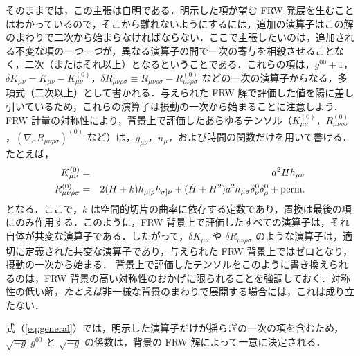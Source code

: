 そのままでは，この主張は自明である．明示した項が望む FRW 発展を生むことはわかっているので，そこから離れないようにするには，追加の演算子はこの解のまわりで二次から始まらなければならない．ここで主張したいのは，追加される不変な項の{\em 一つ一つ}が，異なる演算子の間で一次の寄与を相殺させることなく，二次（またはそれ以上）となるということである．これらの項は，$g^{00}+1$，$\delta K_{\mu\nu}= K_{\mu\nu} -K_{\mu\nu}^{(0)}$，$\delta R_{\mu\nu\rho\sigma} \equiv R_{\mu\nu\rho\sigma} - R_{\mu\nu\rho\sigma}^{(0)}$ などの一次の演算子からなる，多項式（二次以上）として書かれる．与えられた FRW 解で評価した値を陽に差し引いているため，これらの演算子は摂動の一次から始まることに注意しよう．FRW 計量の対称性により，背景上で評価したあらゆるテンソル（$K_{\mu\nu}^{(0)}$，$R_{\mu\nu\rho\sigma}^{(0)}$，$(\nabla_\alpha R_{\mu\nu\rho\sigma})^{(0)}$ など）は，$g_{\mu\nu}$，$n_\mu$，および時間の関数だけを用いて書ける．たとえば，
\begin{eqnarray}
K^{(0)}_{\mu\nu} & =&  a^2 H h_{\mu\nu} \\
R_{\mu\nu\rho\sigma}^{(0)} & = & 2 (H+k) h_{\mu [\rho} h_{\sigma ] \nu} + (\dot H + H^2) a^2 h_{\mu\sigma} \delta_\nu^0 \delta_\rho^0 + {\rm perm.} 
\end{eqnarray}
となる．ここで，$k$ は空間的切片の曲率に依存する定数であり，置換は最後の項にのみ作用する．このように，FRW 背景上で評価したすべての演算子は，それ自体が共変な演算子である．したがって，$\delta K_{\mu\nu}$ や $\delta R_{\mu\nu\rho\sigma}$ のような演算子は，適切に定義された共変な演算子であり，与えられた FRW 背景上ではゼロとなり，摂動の一次から始まる．
背景上で評価したテンソルをこのように書き換えられるのは，FRW 背景の高い対称性のおかげに限られることを強調しておく．対称性の低い解，{\em たとえば}非一様な背景のまわりで展開する場合には，これは成り立たない．

式（\ref{eq:general}）では，明示した演算子だけが揺らぎの一次の項を含むため，$\sqrt{-g}\;g^{00}$ と $\sqrt{-g}$ の係数は，背景の FRW 解によって一意に決定される．

